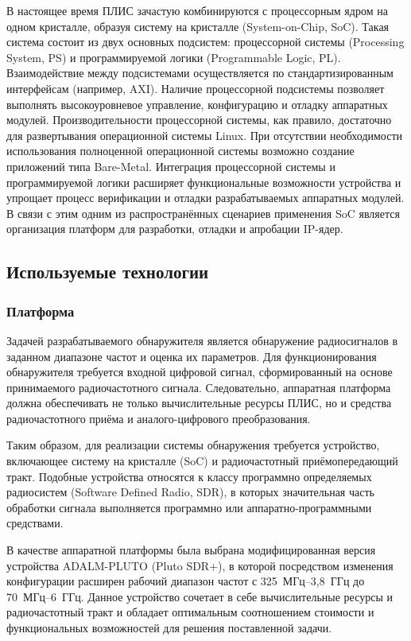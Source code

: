 В настоящее время ПЛИС зачастую комбинируются с процессорным ядром на одном кристалле, образуя систему на кристалле (System-on-Chip, SoC). Такая система состоит из двух основных подсистем: процессорной системы (Processing System, PS) и программируемой логики (Programmable Logic, PL). Взаимодействие между подсистемами осуществляется по стандартизированным интерфейсам (например, AXI). Наличие процессорной подсистемы позволяет выполнять высокоуровневое управление, конфигурацию и отладку аппаратных модулей. Производительности процессорной системы, как правило, достаточно для развертывания операционной системы Linux\cite{linaro_linux, xilinx_linux}. При отсутствии необходимости использования полноценной операционной системы возможно создание приложений типа Bare-Metal. Интеграция процессорной системы и программируемой логики расширяет функциональные возможности устройства и упрощает процесс верификации и отладки разрабатываемых аппаратных модулей. В связи с этим одним из распространённых сценариев применения SoC является организация платформ для разработки, отладки и апробации IP-ядер.


\subsection{Используемые технологии}

\subsubsection{Платформа}

Задачей разрабатываемого обнаружителя является обнаружение радиосигналов в заданном диапазоне частот и оценка их параметров. Для функционирования обнаружителя требуется входной цифровой сигнал, сформированный на основе принимаемого радиочастотного сигнала. Следовательно, аппаратная платформа должна обеспечивать не только вычислительные ресурсы ПЛИС, но и средства радиочастотного приёма и аналого-цифрового преобразования.

Таким образом, для реализации системы обнаружения требуется устройство, включающее систему на кристалле (SoC) и радиочастотный приёмопередающий тракт. Подобные устройства относятся к классу программно определяемых радиосистем (Software Defined Radio, SDR), в которых значительная часть обработки сигнала выполняется программно или аппаратно-программными средствами.

В качестве аппаратной платформы была выбрана модифицированная версия устройства ADALM-PLUTO (Pluto SDR+), в которой посредством изменения конфигурации расширен рабочий диапазон частот с 325~МГц--3{,}8~ГГц до 70~МГц--6~ГГц. Данное устройство сочетает в себе вычислительные ресурсы и радиочастотный тракт и обладает оптимальным соотношением стоимости и функциональных возможностей для решения поставленной задачи.


